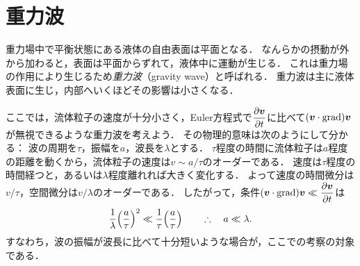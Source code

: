 \section{重力波}

重力場中で平衡状態にある液体の自由表面は平面となる．
なんらかの摂動が外から加わると，表面は平面からずれて，液体中に運動が生じる．
これは重力場の作用により生じるため\emph{重力波}（gravity wave）と呼ばれる．
重力波は主に液体表面に生じ，内部へいくほどその影響は小さくなる．


ここでは，流体粒子の速度が十分小さく，Euler方程式で$\dpdv{\v}{t}$に比べて$(\vb*{v}\cdot\operatorname{grad})\vb*{v}$が無視できるような重力波を考えよう．
その物理的意味は次のようにして分かる：
波の周期を$\tau$，振幅を$a$，波長を$\lambda$とする．
$\tau$程度の時間に流体粒子は$a$程度の距離を動くから，流体粒子の速度は$v\sim a/\tau$のオーダーである．
速度は$\tau$程度の時間経つと，あるいは$\lambda$程度離れれば大きく変化する．
よって速度の時間微分は$v/\tau$，空間微分は$v/\lambda$のオーダーである．
したがって，条件$(\v\cdot\Grad)\v \ll \dpdv{\v}{t}$は
\begin{equation}
    \frac{1}{\lambda} \pqty{\frac{a}{\tau}}^2 \ll \frac{1}{\tau} \pqty{\frac{a}{\tau}}
    \qquad\yueni a \ll \lambda .
\end{equation}
すなわち，波の振幅が波長に比べて十分短いような場合が，ここでの考察の対象である．


